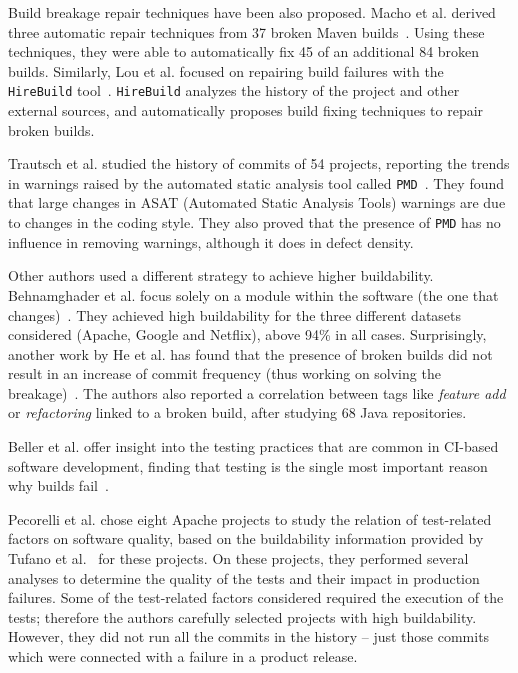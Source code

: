 Build breakage repair techniques have been also proposed. Macho et al. derived three automatic repair techniques from 37 broken Maven builds~\cite{macho2018automatically}. Using these techniques, they were able to automatically fix 45 of an additional 84 broken builds. Similarly, Lou et al. focused on repairing build failures with the \texttt{HireBuild} tool~\cite{lou:2019:historyfailurefix}. \texttt{HireBuild} analyzes the history of the project and other external sources, and automatically proposes build fixing techniques to repair broken builds. 

Trautsch et al. studied the history of commits of 54 projects, reporting the trends in warnings raised by the automated static analysis tool called \texttt{PMD}~\cite{trautsch2020longitudinal}. They found that large changes in ASAT (Automated Static Analysis Tools) warnings are due to changes in the coding style. They also proved that the presence of \texttt{PMD} has no influence in removing warnings, although it does in defect density.

Other authors used a different strategy to achieve higher buildability. Behnamghader et al. focus solely on a module within the software (the one that changes)~\cite{behnamghader2018scalable}. They achieved high buildability for the three different datasets considered (Apache, Google and Netflix), above 94\% in all cases. Surprisingly, another work by He et al. has found that the presence of broken builds did not result in an increase of commit frequency (thus working on solving the breakage)~\cite{he2020characteristics}. The authors also reported a correlation between tags like \textit{feature add} or \textit{refactoring} linked to a broken build, after studying 68 Java repositories.

Beller et al. offer insight into the testing practices that are common in CI-based software development, finding that testing is the single most important reason why builds fail~\cite{beller2017oops}.

Pecorelli et al. chose eight Apache projects to study the relation of test-related factors on software quality, based on the buildability information provided by Tufano et al.~\cite{tufano2017there} for these projects. On these projects, they performed several analyses to determine the quality of the tests and their impact in production failures. Some of the test-related factors considered required the execution of the tests; therefore the authors carefully selected projects with high buildability. However, they did not run all the commits in the history -- just those commits which were connected with a failure in a product release. 

